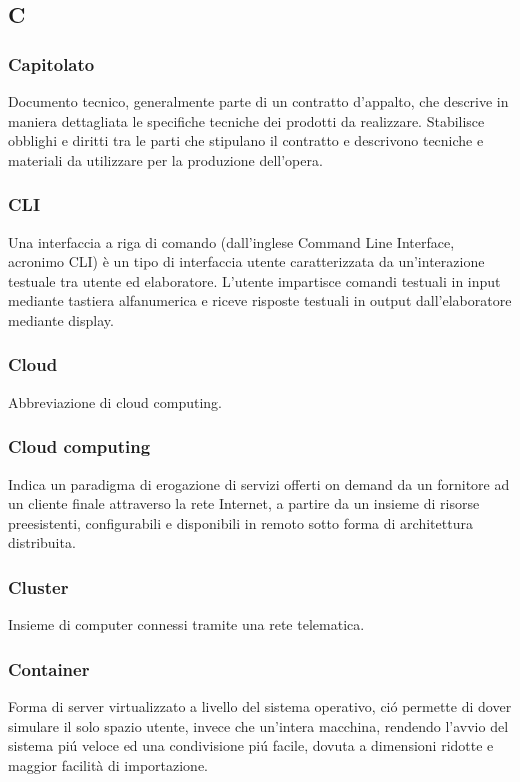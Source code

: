 \subsection*{\textbf{\hfill \Huge{C} \hfill}} 
\subsubsection*{Capitolato}
Documento tecnico, generalmente parte di un contratto d'appalto, che descrive in maniera dettagliata le specifiche tecniche dei prodotti da realizzare. Stabilisce obblighi e diritti tra le parti che stipulano il contratto e descrivono tecniche e materiali da utilizzare per la produzione dell'opera. 

\subsubsection*{CLI}
Una interfaccia a riga di comando (dall'inglese Command Line Interface, acronimo CLI) è un tipo di interfaccia utente caratterizzata da un'interazione testuale tra utente ed elaboratore. L'utente impartisce comandi testuali in input mediante tastiera alfanumerica e riceve risposte testuali in output dall'elaboratore mediante display.

\subsubsection*{Cloud}
Abbreviazione di cloud computing\glos.

\subsubsection*{Cloud computing}
Indica un paradigma di erogazione di servizi offerti on demand da un fornitore ad un cliente finale attraverso la rete Internet, a partire da un insieme di risorse preesistenti, configurabili e disponibili in remoto sotto forma di architettura distribuita.

\subsubsection*{Cluster}
Insieme di computer connessi tramite una rete telematica.

\subsubsection*{Container}
Forma di server virtualizzato a livello del sistema operativo, ció permette di dover simulare il solo spazio utente, invece che un'intera macchina, rendendo l'avvio del sistema piú veloce ed una condivisione piú facile, dovuta a dimensioni ridotte e maggior facilità di importazione. 

